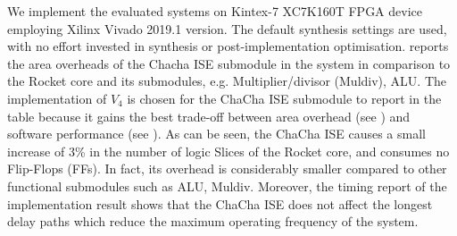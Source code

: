 We implement the evaluated systems on Kintex-7 XC7K160T FPGA device employing Xilinx Vivado 2019.1 version. 
The default synthesis settings are used, with no effort invested in synthesis or post-implementation optimisation.
 reports the area overheads of the Chacha ISE submodule in the system in comparison to the Rocket core and its submodules, e.g. Multiplier/divisor (Muldiv), ALU. 
The implementation of $V_4$ is chosen for the ChaCha ISE submodule to report in the table because it gains the best trade-off between area overhead (see ) and software performance (see ). 
As can be seen, 
the ChaCha ISE causes a small increase of 3\% in the number of logic Slices of the Rocket core, and consumes no Flip-Flops (FFs). 
In fact, its overhead is considerably smaller compared to other functional submodules such as ALU, Muldiv. 
Moreover, the timing report of the implementation result shows that the ChaCha ISE does not affect the longest delay paths which reduce the maximum operating frequency of the system.



